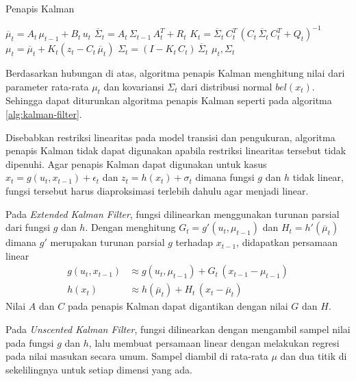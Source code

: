 \begin{algorithm}
    \caption{Penapis Kalman}
    \label{alg:kalman-filter}
    \begin{algorithmic}[1]
        \State $\overline{\mu}_t = A_t\, \mu_{t-1} + B_t\, u_t$
        \State $\overline{\Sigma}_t = A_t\, \Sigma_{t-1}\, A_t^T + R_t$
        \State $K_t = \overline{\Sigma}_t\, C_t^T\, (C_t\, \overline{\Sigma}_t\, C_t^T + Q_t)^{-1}$
        \State $\mu_t = \overline{\mu}_t + K_t(z_t - C_t\, \overline{\mu}_t)$
        \State $\Sigma_t = (I - K_t\, C_t)\, \overline{\Sigma}_t$
        \State \Return $\mu_t, \Sigma_t$
        \EndFunction
    \end{algorithmic}
\end{algorithm}

Berdasarkan hubungan di atas, algoritma penapis Kalman menghitung nilai dari parameter rata-rata $\mu_t$ dan kovariansi $\Sigma_t$ dari distribusi normal $bel(x_t)$. Sehingga dapat diturunkan algoritma penapis Kalman seperti pada algoritma \ref{alg:kalman-filter}.

Disebabkan restriksi linearitas pada model transisi dan pengukuran, algoritma penapis Kalman tidak dapat digunakan apabila restriksi linearitas tersebut tidak dipenuhi. Agar penapis Kalman dapat digunakan untuk kasus $x_t = g(u_t, x_{t-1}) + \epsilon_t$ dan $z_t = h(x_t) + \sigma_t$ dimana fungsi $g$ dan $h$ tidak linear, fungsi tersebut harus diaproksimasi terlebih dahulu agar menjadi linear.

Pada \textit{Extended Kalman Filter}, fungsi dilinearkan menggunakan turunan parsial dari fungsi $g$ dan $h$. Dengan menghitung $G_t = g'(u_t, \mu_{t-1})$ dan $H_t = h'(\overline{\mu}_t)$ dimana $g'$ merupakan turunan parsial $g$ terhadap $x_{t-1}$, didapatkan persamaan linear
\begin{align}
    g(u_t, x_{t-1}) & \approx g(u_t, \mu_{t-1}) + G_t\, (x_{t-1} - \mu_{t-1})      \\
    h(x_t)          & \approx h(\overline{\mu}_t) + H_t\, (x_t - \overline{\mu}_t)
\end{align}
Nilai $A$ dan $C$ pada penapis Kalman dapat digantikan dengan nilai $G$ dan $H$.

Pada \textit{Unscented Kalman Filter}, fungsi dilinearkan dengan mengambil sampel nilai pada fungsi $g$ dan $h$, lalu membuat persamaan linear dengan melakukan regresi pada nilai masukan secara umum. Sampel diambil di rata-rata $\mu$ dan dua titik di sekelilingnya untuk setiap dimensi yang ada.

